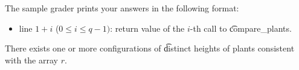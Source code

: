 The sample grader prints your answers in the following format:
\begin{itemize}
\item line $1 + i$ ($0 \leq i \leq q - 1)$: return value of the $i$-th call to \t{compare\_plants}.
\end{itemize}

There exists one or more configurations of \t{distinct heights} of plants consistent with the array $r$.